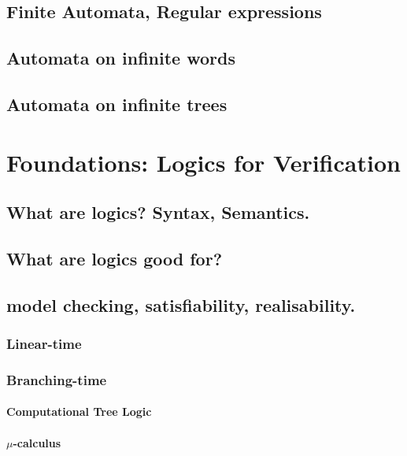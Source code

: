\documentclass{book}
\begin{document}
\section{Finite Automata, Regular expressions}

\section{Automata on infinite words}

\section{Automata on infinite trees}



\chapter{Foundations: Logics for Verification}

\section{What are logics? Syntax, Semantics.}

\section{What are logics good for?}

\section{model checking, satisfiability, realisability.}

\subsection{Linear-time}

\subsection{Branching-time}

\subsubsection{Computational Tree Logic}

\subsubsection{$\mu$-calculus}
\end{document}
